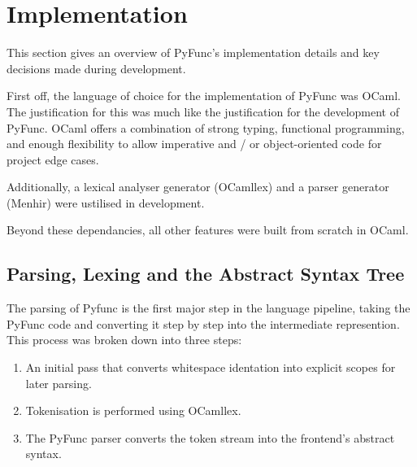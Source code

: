 \documentclass{l4proj}
\begin{document}
\chapter{Implementation}

This section gives an overview of PyFunc's implementation details and key decisions made during development.

First off, the language of choice for the implementation of PyFunc was OCaml.
The justification for this was much like the justification for the development of PyFunc.
OCaml offers a combination of strong typing, functional programming, and enough flexibility to allow imperative and / or object-oriented code for project edge cases.
 
Additionally, a lexical analyser generator (OCamllex) and a parser generator (Menhir) were ustilised in development.

Beyond these dependancies, all other features were built from scratch in OCaml.

\section{Parsing, Lexing and the Abstract Syntax Tree} \label{sec:parsing-lexing-and-the-ast}


The parsing of Pyfunc is the first major step in the language pipeline, taking the PyFunc code and converting it step by step into the intermediate represention.
This process was broken down into three steps:
\begin{enumerate}
    \item An initial pass that converts whitespace identation into explicit scopes for later parsing.
    \item Tokenisation is performed using OCamllex.
    \item The PyFunc parser converts the token stream into the frontend's abstract syntax.
\end{enumerate}
\end{document}
